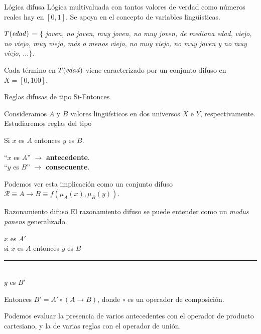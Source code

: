 \documentclass[10pt, spanish]{beamer}
\begin{document}
\begin{frame}{Lógica difusa}
	Lógica multivaluada con tantos valores de verdad como números reales hay en $[0,1]$. Se apoya en el concepto de variables lingüísticas.
  \vspace{1em}

  \begin{example}
$T(\text{\textit{edad}})$ = $\{$ \textit{joven, no joven, muy joven, no muy joven,} \textit{de mediana edad,} \textit{viejo, no viejo, muy viejo, más o menos viejo, no muy viejo,} \textit{no muy joven y no muy viejo, }$\dots \}$.

Cada término en $T(\text{\textit{edad}})$ viene caracterizado por un conjunto difuso en $X=[0,100]$.
\end{example}
\end{frame}

\begin{frame}{Reglas difusas de tipo Si-Entonces}
  \begin{exampleblock}{\vspace*{-3ex}}

	Consideramos $A$ y $B$ valores lingüísticos en dos universos $X$ e $Y$, respectivamente. Estudiaremos reglas del tipo\\

\begin{center}
	Si $x$ es $A$ entonces $y$ es $B$.
\end{center}
\end{exampleblock}
  \vspace{1em}
``$x$ es $A$'' $\rightarrow$ \textbf{antecedente}.\\
``$y$ es $B$'' $\rightarrow$ \textbf{consecuente}.

Podemos ver esta implicación como un conjunto difuso $\mathcal R \equiv A \to B \equiv f(\mu_A(x), \mu_B(y))$.
\end{frame}

\begin{frame}{Razonamiento difuso}
El razonamiento difuso se puede entender como un \textit{modus ponens} generalizado.
  \begin{exampleblock}{\vspace*{-3ex}}
\begin{center}
	$x$ es $A'$\\
    si $x$ es $A$ entonces $y$ es $B$\\
    \rule{7cm}{0.4pt}\\
    $y$ es $B'$
\end{center}

Entonces $B' = A' \circ (A \to B)$, donde $\circ$ es un operador de composición.
\end{exampleblock}
\vspace{1em}

Podemos evaluar la presencia de varios antecedentes con el operador de producto cartesiano, y la de varias reglas con el operador de unión.

\end{frame}
\end{document}
